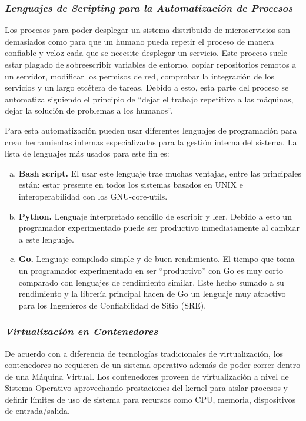 \subsubsection{\textit{Lenguajes de Scripting para la Automatización de Procesos}}

Los procesos para poder desplegar un sistema distribuido de microservicios son demasiados como para que 
un humano pueda repetir el proceso de manera confiable y veloz cada que se necesite desplegar un servicio.
Este proceso suele estar plagado de sobreescribir variables de entorno, copiar repositorios remotos
a un servidor, modificar los permisos de red, comprobar la integración de los servicios y un largo etcétera
de tareas.
Debido a esto, esta parte del proceso se automatiza siguiendo el principio de ``dejar el trabajo repetitivo
a las máquinas, dejar la solución de problemas a los humanos''.

Para esta automatización pueden usar diferentes lenguajes de programación para crear herramientas internas
especializadas para la gestión interna del sistema.
La lista de lenguajes más usados para este fin es:

\vspace{-1em}
\begin{enumerate}[a.]
  \item \textbf{Bash script.}
    El usar este lenguaje trae muchas ventajas, entre las principales están: estar presente en todos
    los sistemas basados en UNIX e interoperabilidad con los GNU-core-utils.
  \item \textbf{Python.}
    Lenguaje interpretado sencillo de escribir y leer.
    Debido a esto un programador experimentado puede ser productivo inmediatamente al cambiar a este lenguaje.
  \item \textbf{Go.}
    Lenguaje compilado simple y de buen rendimiento.
    El tiempo que toma un programador experimentado en ser ``productivo'' con Go es muy corto comparado con
    lenguajes de rendimiento similar.
    Este hecho sumado a su rendimiento y la librería principal hacen de Go un lenguaje muy atractivo
    para los Ingenieros de Confiabilidad de Sitio (SRE).
\end{enumerate}
\vspace{-1em}


\subsubsection{\textit{Virtualización en Contenedores}}
De acuerdo con \cite{celesti2016exploring} a diferencia de tecnologías tradicionales de virtualización,
los contenedores no requieren de un sistema operativo además de poder correr dentro de una Máquina Virtual.
Los contenedores proveen de virtualización a nivel de Sistema Operativo aprovechando prestaciones del kernel
para aislar procesos y definir límites de uso de sistema para recursos como CPU, memoria, dispositivos de
entrada/salida.

